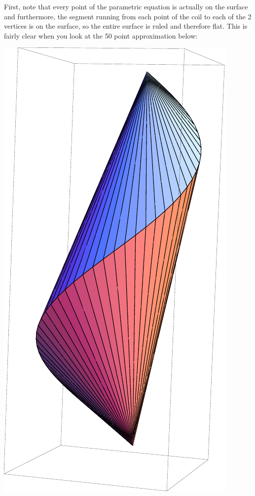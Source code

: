 \documentclass[12pt]{article}
\begin{document}
First, note that every point of the parametric equation is actually on the surface and furthermore, the segment running from each point of the coil to each of the 2 vertices is on the surface, so the entire surface is ruled and therefore flat. This is fairly clear when you look at the 50 point approximation below:
\begin{center}
\includegraphics[scale=.6]{pita_h=5_n=50.pdf}
\end{center}
\end{document}
